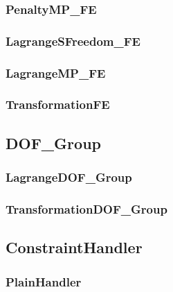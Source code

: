 \documentclass[12pt]{article}
\begin{document}
\pagebreak \subsubsection{PenaltyMP\_FE}



\pagebreak \subsubsection{LagrangeSFreedom\_FE}


\pagebreak \subsubsection{LagrangeMP\_FE}


\pagebreak \subsubsection{TransformationFE}


\pagebreak \subsection{DOF\_Group}


\pagebreak \subsubsection{LagrangeDOF\_Group}


\pagebreak \subsubsection{TransformationDOF\_Group}



\pagebreak \subsection{{\bf ConstraintHandler}}


\pagebreak \subsubsection{PlainHandler}

\end{document}
